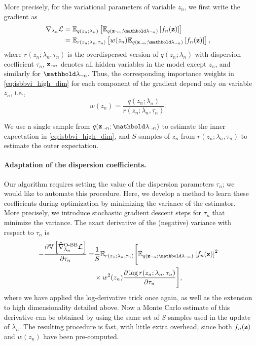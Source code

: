 \documentclass[]{article}
\begin{document}

More precisely, for the variational parameters of variable $z_n$, we first write the gradient as
\begin{equation}\label{eq:isbbvi_high_dim}
	\begin{split}
		\nabla_{\lambda_n}\Lcal & = \E{q(z_n;\lambda_n)}{\E{q(\bz_{\neg n};\blambda_{\neg n})}{f_n(\bz)}}\\
		& = \E{r(z_n;\lambda_n,\tau_n)}{w(z_n)\E{q(\bz_{\neg n};\blambda_{\neg n})}{f_n(\bz)}},
	\end{split}
\end{equation}
where $r(z_n;\lambda_n,\tau_n)$ is the overdispersed version of $q(z_n;\lambda_n)$ with dispersion coefficient $\tau_n$, $\mathbf{z}_{\neg n}$ denotes all hidden variables in the model except $z_n$, and similarly for $\blambda_{\neg n}$. Thus, the corresponding importance weights in \eqref{eq:isbbvi_high_dim} for each component of the gradient depend only on variable $z_n$, i.e.,
\begin{equation}
	w(z_n) = \frac{q(z_n;\lambda_n)}{r(z_n;\lambda_n,\tau_n)}.
\end{equation}

We use a single sample from $q(\bz_{\neg n};\blambda_{\neg n})$ to estimate the inner expectation in \eqref{eq:isbbvi_high_dim}, and $S$ samples of $z_n$ from $r(z_n;\lambda_n,\tau_n)$ to estimate the outer expectation.


\paragraph{Adaptation of the dispersion coefficients.}
Our algorithm requires setting the value of the dispersion parameters $\tau_n$; we would like to automate this procedure. Here, we develop a method to learn these coefficients during  optimization by minimizing the variance of the estimator. More precisely, we introduce stochastic gradient descent steps for $\tau_{n}$ that minimize the variance. The exact derivative of the (negative) variance with respect to $\tau_{n}$ is
\begin{align}\label{eq:dvar_dtau}
	-\frac{\partial \Var{\widehat{\nabla}^{\textrm{O-BB}}_{\lambda_n} \Lcal}}{\partial \tau_n} 
	= & \frac{1}{S} \mathbb{E}_{r(z_n;\lambda_n,\tau_n)} \Bigg[ {\E{q(\bz_{\neg n};\blambda_{\neg n})}{f_n(\bz)}^2} \nonumber \\
	& \times w^2(z_n){\frac{\partial \log r(z_n;\lambda_n,\tau_n)}{\partial \tau_n}}\Bigg],
\end{align}
where we have applied the log-derivative trick once again, as well as the extension to high dimensionality detailed above. Now a Monte Carlo estimate of this derivative can be obtained by using the same set of $S$ samples used in the update of $\lambda_n$. The resulting procedure is fast, with little extra overhead, since both $f_n(\mathbf{z})$ and $w(z_n)$ have been pre-computed.
\end{document}
